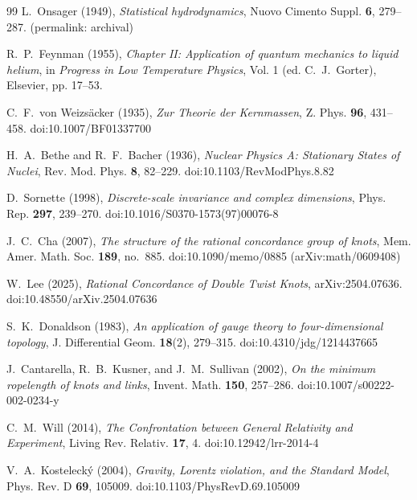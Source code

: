 \documentclass[11pt]{article}
\theoremstyle{definition}
\theoremstyle{plain}
\theoremstyle{remark}
\begin{document}
\begin{thebibliography}{99}
            L.~Onsager (1949),
            \emph{Statistical hydrodynamics},
            Nuovo Cimento Suppl. \textbf{6}, 279--287.
            (permalink: archival)

            R.~P.~Feynman (1955),
            \emph{Chapter II: Application of quantum mechanics to liquid helium},
            in \emph{Progress in Low Temperature Physics}, Vol. 1 (ed. C.~J.~Gorter),
            Elsevier, pp. 17--53.

            C.~F.~von Weizs\"acker (1935),
            \emph{Zur Theorie der Kernmassen},
            Z. Phys. \textbf{96}, 431--458.
            doi:10.1007/BF01337700

            H.~A.~Bethe and R.~F.~Bacher (1936),
            \emph{Nuclear Physics A: Stationary States of Nuclei},
            Rev. Mod. Phys. \textbf{8}, 82--229.
            doi:10.1103/RevModPhys.8.82

            D.~Sornette (1998),
            \emph{Discrete-scale invariance and complex dimensions},
            Phys. Rep. \textbf{297}, 239--270.
            doi:10.1016/S0370-1573(97)00076-8

            J.~C.~Cha (2007),
            \emph{The structure of the rational concordance group of knots},
            Mem. Amer. Math. Soc. \textbf{189}, no.~885.
            doi:10.1090/memo/0885
            (arXiv:math/0609408)

            W.~Lee (2025),
            \emph{Rational Concordance of Double Twist Knots},
            arXiv:2504.07636.
            doi:10.48550/arXiv.2504.07636

            S.~K.~Donaldson (1983),
            \emph{An application of gauge theory to four-dimensional topology},
            J. Differential Geom. \textbf{18}(2), 279--315.
            doi:10.4310/jdg/1214437665

            J.~Cantarella, R.~B.~Kusner, and J.~M.~Sullivan (2002),
            \emph{On the minimum ropelength of knots and links},
            Invent. Math. \textbf{150}, 257--286.
            doi:10.1007/s00222-002-0234-y

            C.~M.~Will (2014),
            \emph{The Confrontation between General Relativity and Experiment},
            Living Rev. Relativ. \textbf{17}, 4.
            doi:10.12942/lrr-2014-4

            V.~A.~Kosteleck\'y (2004),
            \emph{Gravity, Lorentz violation, and the Standard Model},
            Phys. Rev. D \textbf{69}, 105009.
            doi:10.1103/PhysRevD.69.105009

        \end{thebibliography}
\end{document}
